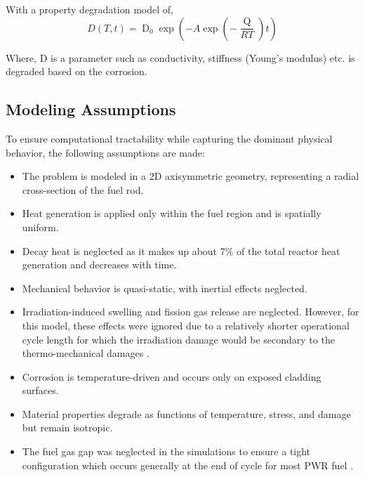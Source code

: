 With a property degradation model of,
\begin{equation}
    D\left(T,t\right)=\operatorname{D}_0\exp{\left(-A\exp{\left(-\frac{\operatorname{Q}}{RT}\right)}t\right)}
\end{equation}

Where, D is a parameter such as conductivity, stiffness (Young’s modulus) etc. is degraded based on the corrosion.

\subsection{Modeling Assumptions}

To ensure computational tractability while capturing the dominant physical behavior, the following assumptions are made:
\begin{itemize}
    \item The problem is modeled in a 2D axisymmetric geometry, representing a radial cross-section of the fuel rod.
    \item Heat generation is applied only within the fuel region and is spatially uniform.
    \item Decay heat is neglected as it makes up about 7\% of the total reactor heat generation and decreases with time. 
    \item Mechanical behavior is quasi-static, with inertial effects neglected.
    \item Irradiation-induced swelling and fission gas release are neglected. However, for this model, these effects were ignored due to a relatively shorter operational cycle length for which the irradiation damage would be secondary to the thermo-mechanical damages \cite{Sweet2016BISONProperties}.%
    \item Corrosion is temperature-driven and occurs only on exposed cladding surfaces.
    \item Material properties degrade as functions of temperature, stress, and damage but remain isotropic.
    \item The fuel gas gap was neglected in the simulations to ensure a tight configuration which occurs generally at the end of cycle for most PWR fuel \cite{Barrett2012AdvancedStudy}.%
\end{itemize}


